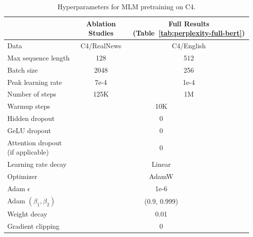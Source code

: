 \documentclass{article}
\begin{document}
\begin{table}[t]
\centering
\begin{tabular}{@{}l|c|c@{}}
\toprule
 & Ablation Studies & Full Results (Table~\ref{tab:perplexity-full-bert}) \\ \midrule
Data & C4/RealNews & C4/English \\
Max sequence length & 128 & 512 \\
Batch size & 2048 & 256 \\
Peak learning rate & 7e-4 & 1e-4 \\
Number of steps & 125K & 1M \\
\midrule
Warmup steps & \multicolumn{2}{c}{10K} \\
Hidden dropout & \multicolumn{2}{c}{0} \\
GeLU dropout & \multicolumn{2}{c}{0} \\
Attention dropout (if applicable) & \multicolumn{2}{c}{0} \\
Learning rate decay & \multicolumn{2}{c}{Linear} \\
Optimizer & \multicolumn{2}{c}{AdamW} \\
Adam $\epsilon$ & \multicolumn{2}{c}{1e-6} \\
Adam $(\beta_1, \beta_2)$ & \multicolumn{2}{c}{(0.9, 0.999)} \\
Weight decay & \multicolumn{2}{c}{0.01} \\ 
Gradient clipping & \multicolumn{2}{c}{0} \\
\bottomrule
\end{tabular}
\caption{Hyperparameters for MLM pretraining on C4.}
\end{table}
\end{document}
